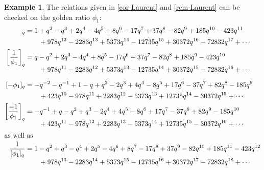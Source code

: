 \documentclass[11pt,reqno]{amsart}
\theoremstyle{plain}
\theoremstyle{definition}
\newtheorem{exemple}[lemme]{Example}
\numberwithin{figure}{section}
\numberwithin{table}{section}
\numberwithin{equation}{section}
\let\fr=\frac
\begin{document}
\begin{exemple}
The relations given in \cref{cor-Laurent} and \cref{rem-Laurent} can be checked on the golden ratio $\phi_1$:
\begin{align*}
[\phi_1]_q&=1 + q^2 -q^3 + 2q^4 -4q^5 + 8q^6 -17q^7 + 37q^8 -82q^9 + 185q^{10}-423q^{11}\\
&\qquad  + 978q^{12} -2283q^{13} + 5373q^{14} -12735q^{15} + 30372q^{16} -72832q^{17} +\cdots\\
\left[\fr 1{\phi_1}\right]_q&=q -q^2 + 2q^3 -4q^4 + 8q^5 -17q^6 + 37q^7 -82q^8 + 185q^9 -423q^{10} \\[-6pt]
&\qquad+ 978q^{11} -2283q^{12} + 5373q^{13} -12735q^{14} + 30372q^{15} -72832q^{16} +\cdots\\[6pt]
[-\phi_1]_q&=-q^{-2} -q^{-1} + 1 -q + q^2 -2q^3 + 4q^4 -8q^5 + 17q^6 -37q^7 + 82q^8 -185q^9\\
&\qquad + 423q^{10} -978q^{11} + 2283q^{12} -5373q^{13} + 12735q^{14} -30372q^{15} +\cdots\\
\left[\fr {-1}{\phi_1}\right]_q&=-q^{-1} + q -q^2 + q^3 -2q^4 + 4q^5 -8q^6 + 17q^7 -37q^8 + 82q^9-185q^{10}\\[-6pt]
&\qquad  + 423q^{11} -978q^{12} + 2283q^{13} -5373q^{14} + 12735q^{15} -30372q^{16}+\cdots\\
\intertext{as well as}
\fr 1{[\phi_1]_q}&=
1 -  q^{2} +  q^{3} -  q^{4} + 2 q^{5} - 4 q^{6} + 8 q^{7} - 17 q^{8} + 37 q^{9} - 82 q^{10}+ 185 q^{11} - 423 q^{12}\\[-3pt]
&\qquad   + 978 q^{13} - 2283 q^{14} + 5373 q^{15} - 12735 q^{16} + 30372 q^{17} - 72832 q^{18} +\cdots
\end{align*}
\end{exemple}
\end{document}
